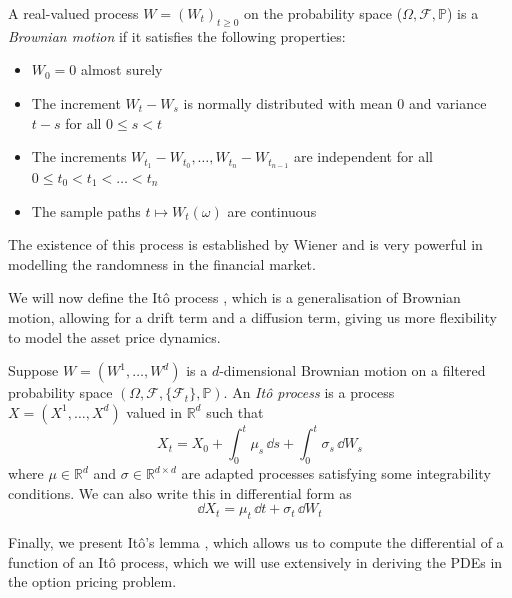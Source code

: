 \begin{definition}
    A real-valued process $W = (W_t)_{t \ge 0}$ on the probability space ($\Omega, \mathcal F, \mathbb P$) is a \textit{Brownian motion} if it satisfies the following properties:
    \begin{itemize}
        \item $W_0 = 0$ almost surely
        \item The increment $W_t - W_s$ is normally distributed with mean $0$ and variance $t-s$ for all $0 \le s < t$
        \item The increments $W_{t_1} - W_{t_0}, \dots, W_{t_n} - W_{t_{n-1}}$ are independent for all $0 \le t_0 < t_1 < \dots < t_n$
        \item The sample paths $t \mapsto W_t(\omega)$ are continuous
    \end{itemize}
\end{definition}

The existence of this process is established by Wiener \cite{wiener1923differential} and is very powerful in modelling the randomness in the financial market.

We will now define the Itô process \cite{pham2009continuous}, which is a generalisation of Brownian motion, allowing for a drift term and a diffusion term, giving us more flexibility to model the asset price dynamics.

\begin{definition}
    Suppose $W = (W^1, \dots, W^d)$ is a $d$-dimensional Brownian motion on a filtered probability space $(\Omega, \mathcal F, \{\mathcal F_t\}, \mathbb P)$. An \textit{Itô process} is a process $X = (X^1, \dots, X^d)$ valued in $\mathbb R^d$ such that
    \begin{equation}
        X_t = X_0 + \int_0^t \mu_s \,\dd s + \int_0^t \sigma_s \,\dd W_s
    \end{equation}
    where $\mu \in \mathbb R^d$ and $\sigma \in \mathbb R^{d \times d}$ are adapted processes satisfying some integrability conditions. We can also write this in differential form as
    \begin{equation}
        \dd X_t = \mu_t \,\dd t + \sigma_t \,\dd W_t
    \end{equation}
\label{def:ito_process}
\end{definition}

Finally, we present Itô's lemma \cite{pham2009continuous}, which allows us to compute the differential of a function of an Itô process, which we will use extensively in deriving the PDEs in the option pricing problem.

